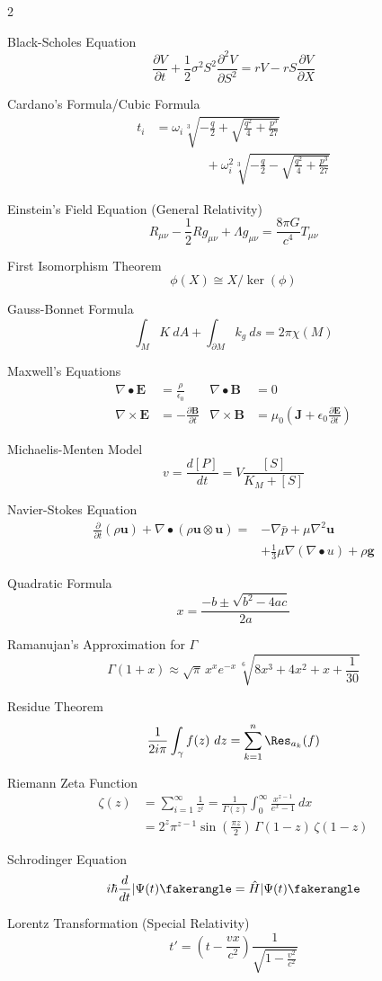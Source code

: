 \begin{multicols}{2}
\let\medskip\relax

Black-Scholes Equation
\[
\frac{\partial V}{\partial t}+\frac12\sigma^2S^2\frac{\partial^2V}{\partial S^2}=
  rV-rS\frac{\partial V}{\partial X}
\]
\medskip

Cardano's Formula/Cubic Formula
\begin{align*}
t_i&=\omega_i\sqrt[3]{-\frac q2+\sqrt{\frac{q^2}4+\frac{p^3}{27}}}\\
  &\qquad\qquad{}+\omega_i^2\sqrt[3]{-\frac q2-\sqrt{\frac{q^2}4+\frac{p^3}{27}}}
\end{align*}
\medskip

Einstein's Field Equation (General Relativity)
\[
R_{\mu\nu}-\frac12Rg_{\mu\nu}+\Lambda g_{\mu\nu}=\frac{8\pi G}{c^4}T_{\mu\nu}
\]
\medskip

First Isomorphism Theorem
\[
\phi(X)\cong X/\ker(\phi)
\]
\medskip

Gauss-Bonnet Formula
\[
\int_MK\ dA+\int_{\partial M}k_g\ ds=2\pi\chi(M)
\]
\medskip

Maxwell's Equations
\begin{align*}
\nabla\bullet\mathbf E&=\frac\rho{\epsilon_0}&
\nabla\bullet\mathbf B&=0\\
\nabla\times\mathbf E&=-\frac{\partial\mathbf B}{\partial t}&
\nabla\times\mathbf B&=\mu_0\left(\mathbf J+
  \epsilon_0\frac{\partial\mathbf E}{\partial t}\right)
\end{align*}
\medskip

Michaelis-Menten Model
\[
v=\frac{d[P]}{dt}=V\frac{[S]}{K_M+[S]}
\]


Navier-Stokes Equation
\begin{align*}
\frac{\partial}{\partial t}(\rho\mathbf{u})+\nabla\bullet
  (\rho \mathbf{u}\otimes \mathbf{u})={}
  &{-}\nabla\bar p+\mu\nabla^2\mathbf{u}\\
  &+\frac13\mu\nabla(\nabla\bullet u)+
  \rho\mathbf{g}
\end{align*}
\medskip

Quadratic Formula
\[
x=\frac{-b\pm\sqrt{b^2-4ac}}{2a}
\]
\medskip

Ramanujan's Approximation for $\Gamma$
\[
\Gamma(1+x)\approx\sqrt\pi\,x^xe^{-x}\,\sqrt[6]{8x^3+4x^2+x+\frac1{30}}
\]
\medskip

Residue Theorem
\[
\frac1{2i\pi}\int_{\gamma}f(z)\ dz=\sum_{k=1}^n\Res_{a_k}(f)
\]
\medskip

Riemann Zeta Function
\begin{align*}
\zeta(z)&=\sum_{i=1}^\infty\frac1{z^i}
  =\frac1{\Gamma(z)}\int_0^\infty\frac{x^{z-1}}{e^x-1}\ dx\\
  &=2^z\pi^{z-1}\sin\left(\frac{\pi z}2\right)\,\Gamma(1-z)\,\zeta(1-z)
\end{align*}
\medskip

Schrodinger Equation
\[
i\hbar\frac d{dt}|\Psi(t)\fakerangle=\hat H|\Psi(t)\fakerangle
\]
\medskip

Lorentz Transformation (Special Relativity)
\[
t'=\left(t-\frac{vx}{c^2}\right)\frac1{\sqrt{1-\frac{v^2}{c^2}}}
\]

\end{multicols}
\endinput
